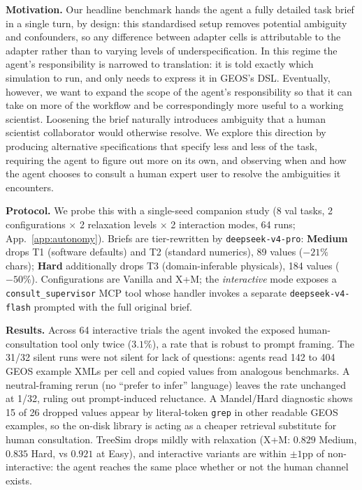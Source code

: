\documentclass{article}
\begin{document}
\textbf{Motivation.} Our headline benchmark hands the agent a fully detailed task brief in a single turn, by design: this standardised setup removes potential ambiguity and confounders, so any difference between adapter cells is attributable to the adapter rather than to varying levels of underspecification. In this regime the agent's responsibility is narrowed to translation: it is told exactly which simulation to run, and only needs to express it in GEOS's DSL. Eventually, however, we want to expand the scope of the agent's responsibility so that it can take on more of the workflow and be correspondingly more useful to a working scientist. Loosening the brief naturally introduces ambiguity that a human scientist collaborator would otherwise resolve. We explore this direction by producing alternative specifications that specify less and less of the task, requiring the agent to figure out more on its own, and observing when and how the agent chooses to consult a human expert user to resolve the ambiguities it encounters.

\textbf{Protocol.} We probe this with a single-seed companion study (8 val tasks, 2 configurations $\times$ 2 relaxation levels $\times$ 2 interaction modes, 64 runs; App.~\ref{app:autonomy}). Briefs are tier-rewritten by \texttt{deepseek-v4-pro}: \textbf{Medium} drops T1 (software defaults) and T2 (standard numerics), 89 values ($-21\%$ chars); \textbf{Hard} additionally drops T3 (domain-inferable physicals), 184 values ($-50\%$). Configurations are Vanilla and X+M; the \emph{interactive} mode exposes a \texttt{consult\_supervisor} MCP tool whose handler invokes a separate \texttt{deepseek-v4-flash} prompted with the full original brief.

\textbf{Results.} Across 64 interactive trials the agent invoked the exposed human-consultation tool only twice ($3.1\%$), a rate that is robust to prompt framing. The 31/32 silent runs were not silent for lack of questions: agents read 142 to 404 GEOS example XMLs per cell and copied values from analogous benchmarks. A neutral-framing rerun (no ``prefer to infer'' language) leaves the rate unchanged at 1/32, ruling out prompt-induced reluctance. A Mandel/Hard diagnostic shows 15 of 26 dropped values appear by literal-token \texttt{grep} in other readable GEOS examples, so the on-disk library is acting as a cheaper retrieval substitute for human consultation. TreeSim drops mildly with relaxation (X+M: $0.829$ Medium, $0.835$ Hard, vs $0.921$ at Easy), and interactive variants are within $\pm 1$pp of non-interactive: the agent reaches the same place whether or not the human channel exists.
\end{document}
